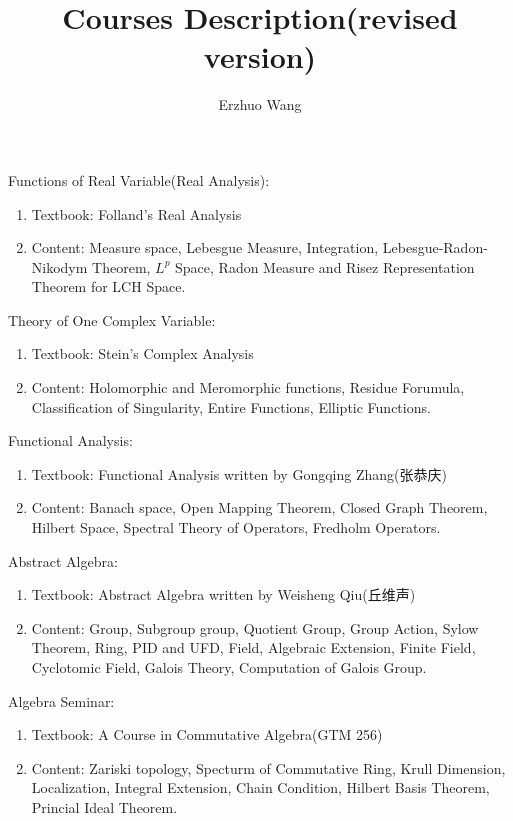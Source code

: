 \documentclass[12pt]{article}
\title{Courses Description(revised version)}
\author{Erzhuo Wang}
\date{}
\newenvironment{enu}{\begin{enumerate}[(1)]}{\end{enumerate}}
\theoremstyle{definition}
\begin{document}
\maketitle 

Functions of Real Variable(Real Analysis):
\begin{enu}
    \item Textbook: Folland's Real Analysis
    \item Content: Measure space, Lebesgue Measure, Integration, 
    Lebesgue-Radon-Nikodym Theorem, $L^p$ Space, Radon Measure 
    and Risez Representation Theorem for LCH Space.
\end{enu}

Theory of One Complex Variable: 
\begin{enu}
    \item Textbook: Stein's Complex Analysis
    \item Content: Holomorphic and Meromorphic functions, Residue Forumula, 
    Classification of Singularity, Entire Functions, 
    Elliptic Functions. 
\end{enu}

Functional Analysis: 
\begin{enu}
    \item Textbook: Functional Analysis written by Gongqing Zhang(张恭庆) 
    \item Content: Banach space, 
    Open Mapping Theorem, Closed Graph Theorem, Hilbert Space,  
    Spectral Theory of Operators, Fredholm Operators.
\end{enu}
Abstract Algebra: 
\begin{enu}
    \item Textbook: Abstract Algebra written by Weisheng Qiu(丘维声)
    \item Content: Group, Subgroup group, Quotient Group, Group Action, Sylow Theorem, 
    Ring, PID and UFD, Field, Algebraic Extension, Finite Field, 
    Cyclotomic Field, Galois Theory, Computation of Galois Group. 

\end{enu}



Algebra Seminar: 
\begin{enu}
    \item Textbook: A Course in Commutative Algebra(GTM 256)
    \item Content: Zariski topology, 
    Specturm of Commutative Ring, Krull Dimension, Localization, 
    Integral Extension, Chain Condition, Hilbert Basis Theorem, Princial Ideal Theorem.   
\end{enu}
\end{document}
